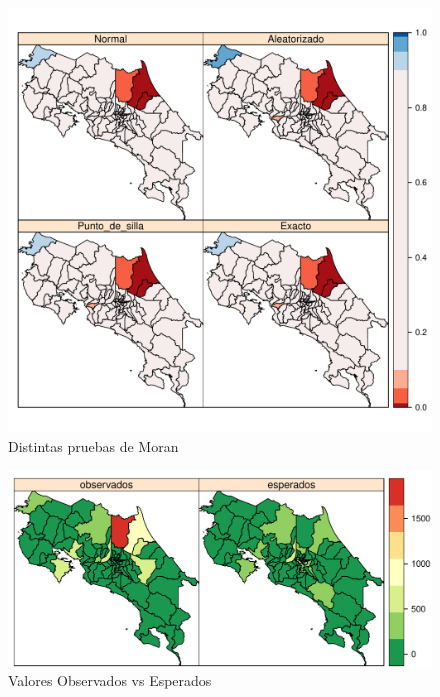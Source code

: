 \documentclass[12pt,a4paper]{article}
\begin{document}
\begin{figure}[hbtp]
\centering
\includegraphics[scale=0.75]{FA7.pdf}
\caption{Distintas pruebas de Moran}
\end{figure}

\begin{figure}[hbtp]
\centering
\includegraphics[scale=0.75]{FA8.pdf}
\caption{Valores Observados vs Esperados}
\end{figure}
\end{document}

